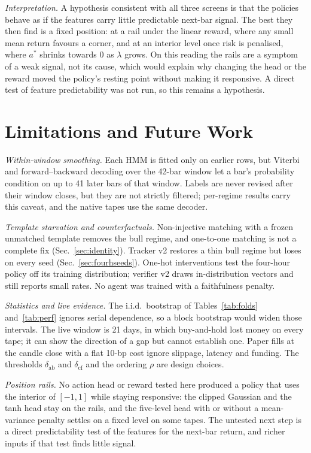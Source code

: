 \documentclass[conference]{IEEEtran}
\begin{document}
\emph{Interpretation.} A hypothesis consistent with all three screens is that the policies behave as if the features carry little predictable next-bar signal. The best they then find is a fixed position: at a rail under the linear reward, where any small mean return favours a corner, and at an interior level once risk is penalised, where $a^*$ shrinks towards 0 as $\lambda$ grows. On this reading the rails are a symptom of a weak signal, not its cause, which would explain why changing the head or the reward moved the policy's resting point without making it responsive. A direct test of feature predictability was not run, so this remains a hypothesis.

\section{Limitations and Future Work}
\emph{Within-window smoothing.} Each HMM is fitted only on earlier rows, but Viterbi and forward--backward decoding over the 42-bar window let a bar's probability condition on up to 41 later bars of that window. Labels are never revised after their window closes, but they are not strictly filtered; per-regime results carry this caveat, and the native tapes use the same decoder.

\emph{Template starvation and counterfactuals.} Non-injective matching with a frozen unmatched template removes the bull regime, and one-to-one matching is not a complete fix (Sec.~\ref{sec:identity}). Tracker v2 restores a thin bull regime but loses on every seed (Sec.~\ref{sec:fourhseeds}). One-hot interventions test the four-hour policy off its training distribution; verifier v2 draws in-distribution vectors and still reports small rates. No agent was trained with a faithfulness penalty.

\emph{Statistics and live evidence.} The i.i.d.\ bootstrap of Tables~\ref{tab:folds} and~\ref{tab:perf} ignores serial dependence, so a block bootstrap would widen those intervals. The live window is 21 days, in which buy-and-hold lost money on every tape; it can show the direction of a gap but cannot establish one. Paper fills at the candle close with a flat 10-bp cost ignore slippage, latency and funding. The thresholds $\delta_{\text{ab}}$ and $\delta_{\text{cf}}$ and the ordering $\rho$ are design choices.

\emph{Position rails.} No action head or reward tested here produced a policy that uses the interior of $[-1,1]$ while staying responsive: the clipped Gaussian and the tanh head stay on the rails, and the five-level head with or without a mean-variance penalty settles on a fixed level on some tapes. The untested next step is a direct predictability test of the features for the next-bar return, and richer inputs if that test finds little signal.
\end{document}
